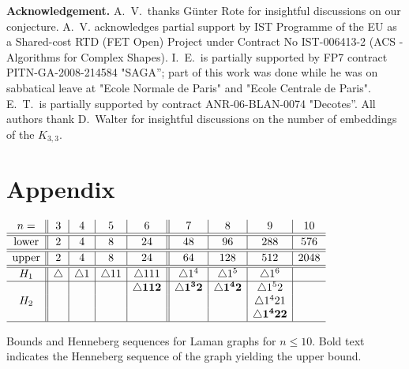 \documentclass[envcountsame]{llncs}
\def\s{{\bigtriangleup}}
\begin{document}
\medskip

\noindent
\textbf{Acknowledgement.}
A.~V.\ thanks G\"unter Rote for insightful discussions on our conjecture. 
A.~V. acknowledges partial support 
by IST Programme of the EU as a Shared-cost RTD (FET Open) Project under Contract 
No IST-006413-2 (ACS - Algorithms for Complex Shapes).
I.~E.\ is partially supported by FP7 contract PITN-GA-2008-214584 "SAGA''; part of this work was done while he was on sabbatical
leave at "Ecole Normale de Paris" and "Ecole Centrale de Paris".
E.~T.\ is partially supported by contract ANR-06-BLAN-0074 "Decotes''. All authors thank D.~Walter for insightful discussions 
on the number of embeddings of the $K_{3,3}$.





\section*{Appendix} 


\begin{table}[h]
  \centering  $ \begin{array}{c||c|c|c|c||c|c|c|c}
    n = & 3& 4 & 5 & 6 & 7 & 8& 9 & 10\\
    \hline \hline
    \mbox{lower} & 2& 4 & 8 & 24 & 48 & 96& 288 & 576 \\
    \hline \hline
    \mbox{upper}& 2& 4 & 8 & 24 & 64 & 128& 512 & 2048\\
    \hline \hline
    H_1 & \s &\s1 & \s11& \s 111 & \s1^4 & \s1^5& \s1^6&\\
    \hline
    &         &       &          &\mathbf{ \s112} & \mathbf{\s1^32} & \mathbf{\s1^42} & \s1^52 &\\
    H_2  &&&&&&& \s1^421&\\
    &&&&&&& \mathbf{\s1^422} &\\
    \hline
  \end{array} $ 
\medskip
  \caption{Bounds and Henneberg sequences for Laman graphs for $n\le 10$. 
Bold text indicates the Henneberg sequence of the graph yielding the upper bound.}
    \label{tab:2D-constructions}
\end{table}
\end{document}
